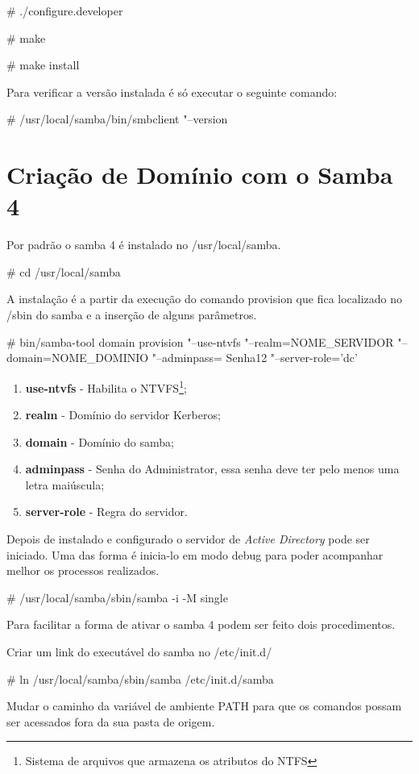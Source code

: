 \# ./configure.developer

\# make 

\# make install

Para verificar a versão instalada é só executar o seguinte comando:

\# /usr/local/samba/bin/smbclient "--version 

\section{Criação de Domínio com o Samba 4}

Por padrão o samba 4 é instalado no /usr/local/samba.

\# cd /usr/local/samba

A instalação é a partir da execução do comando provision que fica localizado no /sbin do samba e a inserção de alguns parâmetros.

\# bin/samba-tool domain provision "--use-ntvfs "--realm=NOME\_SERVIDOR "--domain=NOME\_DOMINIO  "--adminpass= Senha12 "--server-role='dc'

\begin{enumerate}
	\item \textbf{use-ntvfs} - Habilita o NTVFS\footnote[2]{Sistema de arquivos que armazena os atributos do NTFS};
	\item \textbf{realm} - Domínio do servidor Kerberos;
	\item \textbf{domain} - Domínio do samba;
	\item \textbf{adminpass} - Senha do Administrator, essa senha deve ter pelo menos uma letra maiúscula;
	\item \textbf{server-role} - Regra do servidor.
\end{enumerate}

Depois de instalado e configurado o servidor de \textit{Active Directory} pode ser iniciado. Uma das forma é inicia-lo em modo debug para poder acompanhar melhor os processos realizados.

\# /usr/local/samba/sbin/samba -i -M single

Para facilitar a forma de ativar o samba 4 podem ser feito dois procedimentos.

Criar um link do executável do samba no /etc/init.d/

\# ln /usr/local/samba/sbin/samba /etc/init.d/samba

Mudar o caminho da variável de ambiente PATH para que os comandos possam ser acessados fora da sua pasta de origem.

